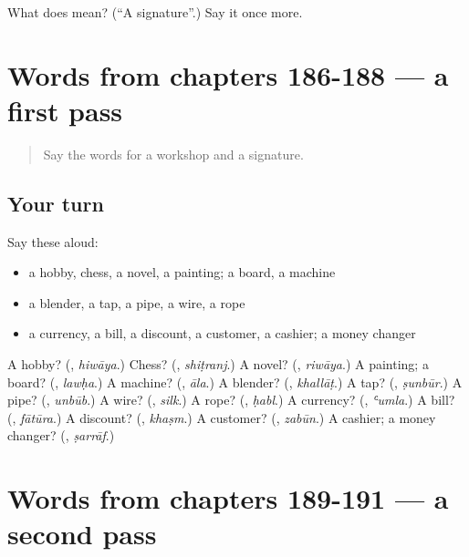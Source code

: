 \begin{tcolorbox}[breakable,colback=teal!4,colframe=teal!35!black,title={Before you move on}]
What does  mean? (\textquotedblleft{}A signature\textquotedblright{}.) Say it once more.
\end{tcolorbox}
\section[(dialogue)]{Words from chapters 186-188 — a first pass}

\label{lesson:AR-R191-first-pass-words-from-chapters-186-188}



\begin{quote}
Say the words for a workshop and a signature.
\end{quote}

\subsection*{Your turn}
Say these aloud:

\begin{itemize}
\raggedright
  \item a hobby, chess, a novel, a painting; a board, a machine
  \item a blender, a tap, a pipe, a wire, a rope
  \item a currency, a bill, a discount, a customer, a cashier; a money changer
\end{itemize}

\begin{tcolorbox}[breakable,colback=teal!4,colframe=teal!35!black,title={Before you move on}]
A hobby? (\textbf{}, \emph{hiwāya}.) Chess? (\textbf{}, \emph{shiṭranj}.) A novel? (\textbf{}, \emph{riwāya}.) A painting; a board? (\textbf{}, \emph{lawḥa}.) A machine? (\textbf{}, \emph{āla}.) A blender? (\textbf{}, \emph{khallāṭ}.) A tap? (\textbf{}, \emph{ṣunbūr}.) A pipe? (\textbf{}, \emph{unbūb}.) A wire? (\textbf{}, \emph{silk}.) A rope? (\textbf{}, \emph{ḥabl}.) A currency? (\textbf{}, \emph{ʿumla}.) A bill? (\textbf{}, \emph{fātūra}.) A discount? (\textbf{}, \emph{khaṣm}.) A customer? (\textbf{}, \emph{zabūn}.) A cashier; a money changer? (\textbf{}, \emph{ṣarrāf}.)
\end{tcolorbox}
\section[(dialogue)]{Words from chapters 189-191 — a second pass}

